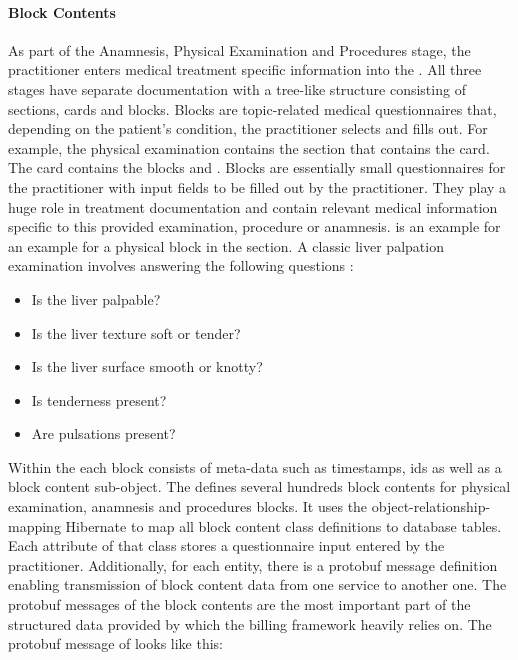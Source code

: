 \paragraph{Block Contents}
As part of the Anamnesis, Physical Examination and Procedures stage,
the practitioner enters medical treatment specific information into the \AVS.
All three stages have separate documentation with a tree-like structure consisting of sections, cards and blocks.
Blocks are topic-related medical questionnaires that, depending on the patient's condition, the practitioner selects and fills out.
For example, the physical examination contains the section  that contains the  card.
The  card contains the blocks  and .
Blocks are essentially small questionnaires for the practitioner with input fields to be filled out by the practitioner.
They play a huge role in treatment documentation and contain relevant medical information specific to this provided examination, procedure or anamnesis.
 is an example for an example for a physical block in the  section.
A classic liver palpation examination involves answering the following questions \cite{wolf1990evaluation}:
\begin{itemize}
    \item Is the liver palpable?
    \item Is the liver texture soft or tender?
    \item Is the liver surface smooth or knotty?
    \item Is tenderness present?
    \item Are pulsations present?
\end{itemize}
Within the \AVS each block consists of meta-data such as timestamps, ids as well as a block content sub-object.
The \AVS defines several hundreds block contents for physical examination, anamnesis and procedures blocks.
It uses the object-relationship-mapping Hibernate to map all block content class definitions to database tables.
Each attribute of that class stores a questionnaire input entered by the practitioner.
Additionally, for each entity, there is a protobuf message definition enabling transmission of block content data from one service
to another one.
The protobuf messages of the block contents are the most important part of the structured data provided by \AV which the billing framework heavily relies on.
The protobuf message of  looks like this:



